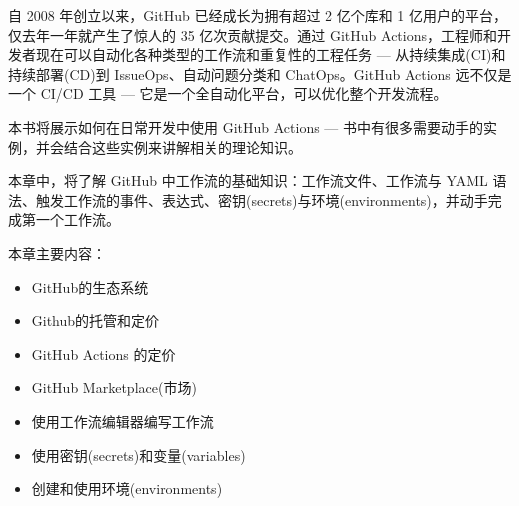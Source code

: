 自 2008 年创立以来，GitHub 已经成长为拥有超过 2 亿个库和 1 亿用户的平台，仅去年一年就产生了惊人的 35 亿次贡献提交。通过 GitHub Actions，工程师和开发者现在可以自动化各种类型的工作流和重复性的工程任务 --- 从持续集成(CI)和持续部署(CD)到 IssueOps、自动问题分类和 ChatOps。GitHub Actions 远不仅是一个 CI/CD 工具 --- 它是一个全自动化平台，可以优化整个开发流程。

本书将展示如何在日常开发中使用 GitHub Actions --- 书中有很多需要动手的实例，并会结合这些实例来讲解相关的理论知识。

本章中，将了解 GitHub 中工作流的基础知识：工作流文件、工作流与 YAML 语法、触发工作流的事件、表达式、密钥(secrets)与环境(environments)，并动手完成第一个工作流。

本章主要内容：

\begin{itemize}
\item 
GitHub的生态系统

\item 
Github的托管和定价

\item 
GitHub Actions 的定价

\item 
GitHub Marketplace(市场)

\item 
使用工作流编辑器编写工作流

\item 
使用密钥(secrets)和变量(variables)

\item 
创建和使用环境(environments)
\end{itemize}